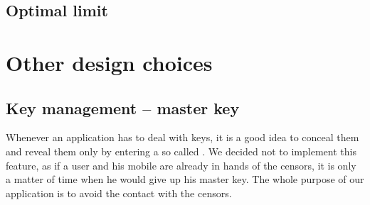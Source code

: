 \subsection{Optimal limit}

\section{Other design choices}

\subsection{Key management -- master key}
Whenever an application has to deal with keys, it is a good idea to conceal them
and reveal them only by entering a so called . We decided not to implement
this feature, as if a user and his mobile are already in hands of the censors, it is only 
a matter of time when he would give up his master key. The whole purpose of our application
is to avoid the contact with the censors.
